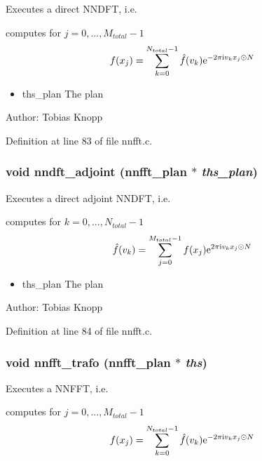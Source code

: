 Executes a direct NNDFT, i.e. 

computes for $j=0,...,M_{total}-1$ \[ f(x_j) = \sum_{k = 0}^{N_{total}-1} \hat{f}(v_k) {\rm e}^{-2 \pi \mbox{\rm\scriptsize i} v_k x_j \odot N} \]

\begin{itemize}
\item ths\_\-plan The plan\end{itemize}
\begin{Desc}
\item[Author:]Tobias Knopp \end{Desc}


Definition at line 83 of file nnfft.c.\hypertarget{group__nnfft_g6c1a04c527de4a3399c776a85bc6533f}{
\subsubsection{\setlength{\rightskip}{0pt plus 5cm}void nndft\_\-adjoint ({\bf nnfft\_\-plan} $\ast$ {\em ths\_\-plan})}}
\label{group__nnfft_g6c1a04c527de4a3399c776a85bc6533f}


Executes a direct adjoint NNDFT, i.e. 

computes for $k=0,...,N_{total}-1$ \[ \hat{f}(v_k) = \sum_{j = 0}^{M_{total}-1} f(x_j) {\rm e}^{2 \pi \mbox{\rm\scriptsize i} v_k x_j \odot N} \]

\begin{itemize}
\item ths\_\-plan The plan\end{itemize}
\begin{Desc}
\item[Author:]Tobias Knopp \end{Desc}


Definition at line 84 of file nnfft.c.\hypertarget{group__nnfft_g994c1748ebe1371c53dd2cb437054d4f}{
\subsubsection{\setlength{\rightskip}{0pt plus 5cm}void nnfft\_\-trafo ({\bf nnfft\_\-plan} $\ast$ {\em ths})}}
\label{group__nnfft_g994c1748ebe1371c53dd2cb437054d4f}


Executes a NNFFT, i.e. 

computes for $j=0,...,M_{total}-1$ \[ f(x_j) = \sum_{k = 0}^{N_{total}-1} \hat{f}(v_k) {\rm e}^{-2 \pi \mbox{\rm\scriptsize i} v_k x_j \odot N} \]

